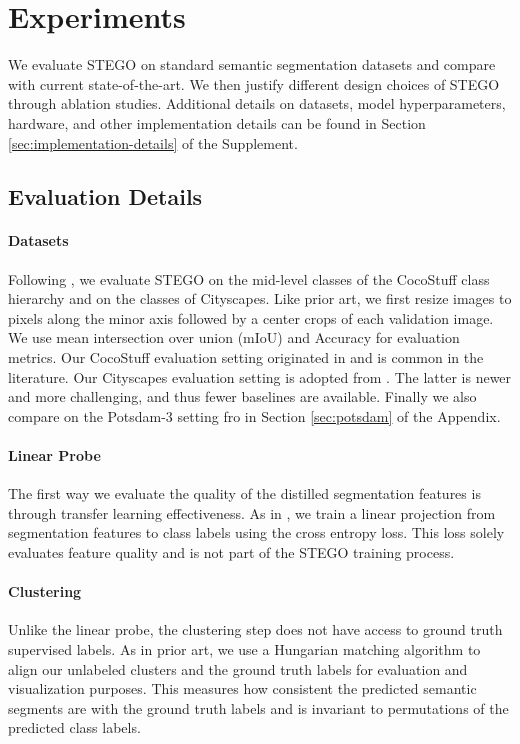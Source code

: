 \documentclass{article} \usepackage{iclr2022_conference,times}
\begin{document}
\section{Experiments}
\vspace{-.1in}

We evaluate STEGO on standard semantic segmentation datasets and compare with current state-of-the-art. We then justify different design choices of STEGO through ablation studies. Additional details on datasets, model hyperparameters, hardware, and other implementation details can be found in Section \ref{sec:implementation-details} of the Supplement.

\subsection{Evaluation Details}
\label{sec:evaluation}
\vspace{-.1in}
\paragraph{Datasets}
Following \cite{Cho2021PiCIEUS}, we evaluate STEGO on the  mid-level classes of the CocoStuff class hierarchy and on the  classes of Cityscapes. Like prior art, we first resize images to  pixels along the minor axis followed by a  center crops of each validation image. We use mean intersection over union (mIoU) and Accuracy for evaluation metrics. Our CocoStuff evaluation setting originated in \cite{iic} and is common in the literature. Our Cityscapes evaluation setting is adopted from \cite{Cho2021PiCIEUS}. The latter is newer and more challenging, and thus fewer baselines are available. Finally we also compare on the Potsdam-3 setting fro \cite{iic} in Section \ref{sec:potsdam} of the Appendix.
\vspace{-.1in}
\paragraph{Linear Probe} The first way we evaluate the quality of the distilled segmentation features is through transfer learning effectiveness. As in \cite{maskcontrast,Cho2021PiCIEUS,chen2020improved}, we train a linear projection from segmentation features to class labels using the cross entropy loss. This loss solely evaluates feature quality and is not part of the STEGO training process.
\vspace{-.3in}
\paragraph{Clustering} Unlike the linear probe, the clustering step does not have access to ground truth supervised labels. As in prior art, we use a Hungarian matching algorithm to align our unlabeled clusters and the ground truth labels for evaluation and visualization purposes. This measures how consistent the predicted semantic segments are with the ground truth labels and is invariant to permutations of the predicted class labels.
\end{document}
